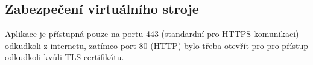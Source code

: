 \subsection{Zabezpečení virtuálního stroje}
Aplikace je přístupná pouze na portu 443 (standardní pro HTTPS komunikaci) odkudkoli z internetu, zatímco port 80 (HTTP) bylo třeba otevřít pro pro pŕístup odkudkoli kvůli TLS certifikátu.